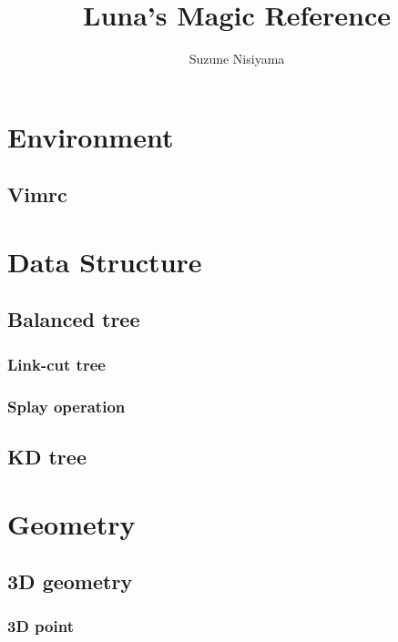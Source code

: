 \documentclass[titlepage,a4paper,10pt]{article}
\title{Luna's Magic Reference}
\author{Suzune Nisiyama}
\date{\today\\ \vspace{100pt} \noindent\rule{\textwidth}{1pt}\\ \vspace{100pt} \normalsize\begin{raggedright}\end{raggedright}}
\begin{document}
	\maketitle
	\begin{multicols}{2}
		\setcounter{tocdepth}{3}
		\begingroup
		\let\cleardoublepage\relax
		\let\clearpage\relax
		\tableofcontents
		\newpage
		\begin{spacing}{0.8}
		{\footnotesize
		\section{Environment}
			\subsection{Vimrc}
				
		\section{Data Structure}
			\subsection{Balanced tree}
				\subsubsection{Link-cut tree}
					
				\subsubsection{Splay operation}
					
			\subsection{KD tree}
				
		\section{Geometry}
			
			\subsection{3D geometry}
				\subsubsection{3D point}
					
}
\end{spacing}
\end{multicols}
\end{document}
